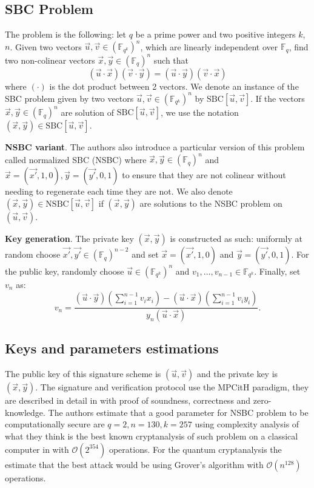 \documentclass[english]{article}
\begin{document}
		\subsection{SBC Problem}
		The problem is the following: let $q$ be a prime power and two positive integers $k$, $n$.
		\newline
		Given two vectors $\vec{u}, \vec{v} \in (\mathbb{F}_{q^k})^n$, which are linearly independent over $\mathbb{F}_q$, find two non-colinear vectors $\vec{x}, \vec{y} \in (\mathbb{F}_q)^n$ such that $$(\vec{u} \cdot \vec{x})(\vec{v} \cdot \vec{y}) = (\vec{u} \cdot \vec{y})(\vec{v} \cdot \vec{x})$$
		where $(\cdot)$ is the dot product between 2 vectors.
		We denote an instance of the SBC problem given by two vectors $\vec{u}, \vec{v} \in (\mathbb{F}_{q^k})^n$ by $\text{SBC}[\vec{u}, \vec{v}]$. If the vectors $\vec{x},\vec{y} \in (\mathbb{F}_q)^n$ are solution of $\text{SBC}[\vec{u},\vec{v}]$, we use the notation $(\vec{x}, \vec{y}) \in \text{SBC}[\vec{u}, \vec{v}]$.
		
		\textbf{NSBC variant}.
		The authors also introduce a particular version of this problem called normalized SBC (NSBC) where $\vec{x}, \vec{y} \in (\mathbb{F}_q)^n$ and
		$\vec{x} = (\vec{x'}, 1, 0), \vec{y} = (\vec{y'}, 0, 1)$ to ensure that they are not colinear without needing to regenerate each time they are not. We also denote $(\vec{x}, \vec{y}) \in \text{NSBC}[\vec{u}, \vec{v}]$ if $(\vec{x}, \vec{y})$ are solutions to the NSBC problem on $(\vec{u}, \vec{v})$.
		
		\textbf{Key generation}. The private key $(\vec{x}, \vec{y})$ is constructed as such: uniformly at random choose $\vec{x'}, \vec{y'} \in (\mathbb{F}_q)^{n-2}$ and set $\vec{x} = (\vec{x'}, 1, 0)$ and $\vec{y} = (\vec{y'}, 0, 1)$.
		For the public key, randomly choose $\vec{u} \in (\mathbb{F}_{q^k})^{n}$ and $v_1,\dots,v_{n-1} \in \mathbb{F}_{q^k}$.
		Finally, set $v_n$ as:
		$$
			v_n = \frac{(\vec{u} \cdot \vec{y})(\sum_{i=1}^{n-1}v_ix_i) - (\vec{u} \cdot \vec{x})(\sum_{i=1}^{n-1}v_iy_i)}{y_n(\vec{u} \cdot \vec{x})}.
		$$
		
		\subsection{Keys and parameters estimations}
		The public key of this signature scheme is $(\vec{u},\vec{v})$ and the private key is $(\vec{x}, \vec{y})$.
		The signature and verification protocol use the MPCitH paradigm, they are described in detail in \cite{HJ23} with proof of soundness, correctness and zero-knowledge.
		The authors estimate that a good parameter for NSBC problem to be computationally secure are $q = 2, n = 130, k = 257$ using complexity analysis of what they think is the best known cryptanalysis of such problem on a classical computer in \cite{FSS11} with $\mathcal{O}(2^{354})$ operations. For the quantum cryptanalysis the estimate that the best attack would be using Grover's algorithm \cite{Grover} with $\mathcal{O}(n^{128})$ operations. 
		
\end{document}
